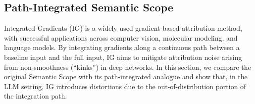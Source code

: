 \documentclass{article}
\begin{document}



\subsection{Path-Integrated Semantic Scope}\label{sec: IG Semantic Scope}

Integrated Gradients (IG) \cite{Sundararajan-Axiomatic-Attribution-DNN-2017} is a widely used gradient-based attribution method, with successful applications across computer vision, molecular modeling, and language models.
By integrating gradients along a continuous path between a baseline input and the full input, IG aims to mitigate attribution noise arising from non-smoothness (``kinks'') in deep networks.
In this section, we compare the original Semantic Scope with its path-integrated analogue and show that, in the LLM setting, IG introduces distortions due to the out-of-distribution portion of the integration path.
\end{document}
